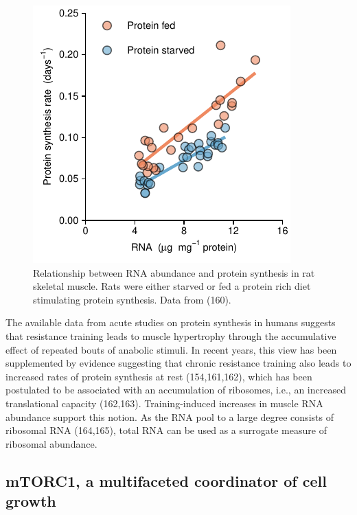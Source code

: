 \documentclass[twoside,10pt]{gihclass} %
\begin{document}
\begin{figure}

{\centering \includegraphics{thesis_files/figure-latex/Millward1973-1} 

}

\caption[Relationship between RNA content and protein synthesis in rat skeletal muscle, data from (160)]{Relationship between RNA abundance and protein synthesis in rat skeletal muscle. Rats were either starved or fed a protein rich diet stimulating protein synthesis. Data from (160).}\label{fig:Millward1973}
\end{figure}
The available data from acute studies on protein synthesis in humans suggests that resistance training leads to muscle hypertrophy through the accumulative effect of repeated bouts of anabolic stimuli. In recent years, this view has been supplemented by evidence suggesting that chronic resistance training also leads to increased rates of protein synthesis at rest
(154,161,162),
which has been postulated to be associated with an accumulation of ribosomes, i.e., an increased translational capacity
(162,163).
Training-induced increases in muscle RNA abundance support this notion.
As the RNA pool to a large degree consists of ribosomal RNA
(164,165),
total RNA can be used as a surrogate measure of ribosomal abundance.

\hypertarget{mtorc1-a-multifaceted-coordinator-of-cell-growth}{%
\subsection{mTORC1, a multifaceted coordinator of cell growth}\label{mtorc1-a-multifaceted-coordinator-of-cell-growth}}
\end{document}
